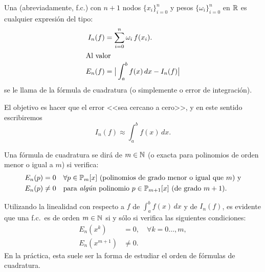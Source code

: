 \begin{definition}
  \label{def:formula-cuadratura}
  Una  (abreviadamente, f.c.) con
  $n+1$ nodos $\{x_i\}_{i=0}^n$ y pesos $\{\omega_i\}_{i=0}^n$ en
  $\operatorname{{\mathbb R}}$ es cualquier expresión del tipo:
  \begin{align}
    \label{eq:f.cuadratura}
    I_n(f)&=\sum_{i=0}^n \omega_i \, f(x_i).
    \\
    \intertext{Al valor}
    \notag
    E_n(f) &= \big|\int_a^b f(x)\, dx - I_n(f)\big|
  \end{align}
  se le llama  de la fórmula de cuadratura (o
  simplemente  o error de integración).
\end{definition}
El objetivo es hacer que el error <<sea cercano a cero>>, y en este
sentido escribiremos
\begin{equation*}
  I_n(f) \approx \int_a^b f(x)\, dx.
\end{equation*}

\begin{definition}
  \label{def:2}
  Una fórmula de cuadratura se dirá de  $m\in\operatorname{{\mathbb N}}$ (o
  exacta para polinomios de orden menor o igual a $m$) si verifica:
  \begin{align*}
    E_n(p)&=0 \quad \forall p\in\operatorname{{\mathbb P}}_m[x] \text{ (polinomios
      de grado menor o igual que $m$) y}
    \\
    E_n(p)&\neq 0 \quad \text{para \emph{algún} polinomio }
    p\in\operatorname{{\mathbb P}}_{m+1}[x] \text{ (de grado $m+1$)}.
  \end{align*}
\end{definition}
\begin{remark}
  \label{rk:5}
  Utilizando la linealidad con respecto a $f$ de $\int_a^bf(x)\,dx$ y
  de $I_n(f)$, es evidente que una f.c.\ es de orden $m\in\operatorname{{\mathbb N}}$ si
  y sólo si verifica las siguientes condiciones:
  \begin{align*}
    E_n(x^k)&=0, \quad \forall k=0\dots,m,
    \\
    E_n(x^{m+1})&\neq 0.
  \end{align*}
  En la práctica, esta suele ser la forma de estudiar el orden de
  fórmulas de cuadratura.
\end{remark}


